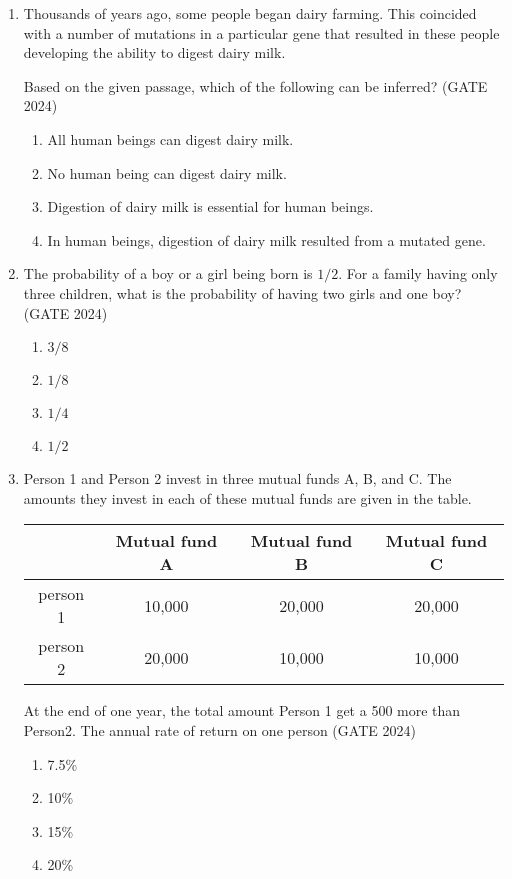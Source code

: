 \documentclass[journal,12pt,onecolumn]{IEEEtran}
\theoremstyle{remark}
\begin{document}
\begin{enumerate}
\item Thousands of years ago, some people began dairy farming. This coincided with a number of mutations in a particular gene that resulted in these people developing the ability to digest dairy milk.

Based on the given passage, which of the following can be inferred?
\hfill{(GATE 2024)}

\begin{enumerate}
    \item All human beings can digest dairy milk.
    \item No human being can digest dairy milk.
    \item Digestion of dairy milk is essential for human beings.
    \item In human beings, digestion of dairy milk resulted from a mutated gene.
\end{enumerate}

\vspace{1cm}
\newpage
\item The probability of a boy or a girl being born is $1/2$. For a family having only three children, what is the probability of having two girls and one boy?
\hfill{(GATE 2024)}
\begin{multicols}{4}
\begin{enumerate}
    \item $3/8$
    \item $1/8$
    \item $1/4$
    \item $1/2$
\end{enumerate}
\end{multicols}
\vspace{1cm}
\item Person 1 and Person 2 invest in three mutual funds A, B, and C. The amounts they invest in each of these mutual funds are given in the table.

\begin{center}
\begin{tabular}{|c|c|c|c|}
\hline
       & Mutual fund A & Mutual fund B & Mutual fund C \\
\hline
person 1 & 10,000 & 20,000 & 20,000\\
person 2 & 20,000 & 10,000 & 10,000\\
\hline
\end{tabular}
\end{center}

At the end of one year, the total amount Person 1 get a 500 more than Person2. The annual rate of return on one person 
\hfill{(GATE 2024)}
\begin{multicols}{4}
\begin{enumerate}
    \item 7.5\%
    \item 10\%
    \item 15\%
    \item 20\%
\end{enumerate}
\end{multicols}
\vspace{1cm}


\end{enumerate}
\end{document}
